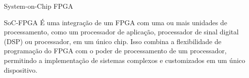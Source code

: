 \documentclass[aspectratio=169]{beamer}
\begin{document}
%	
%	
%	
%		
%	
%
%	
%	


\begin{frame}{System-on-Chip FPGA}
	\justifying
	
	\begin{block}{SoC-FPGA}
		\justifying
		É uma integração de um FPGA com uma ou mais unidades de processamento, como um processador de aplicação, processador de sinal digital (DSP) ou processador, em um único chip. Isso combina a flexibilidade de programação do FPGA com o poder de processamento de um processador, permitindo a implementação de sistemas complexos e customizados em um único dispositivo.
		
	\end{block}	
	
	
\end{frame}
\end{document}
